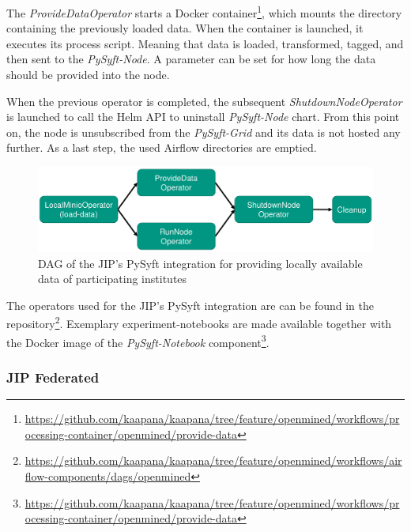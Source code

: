 The \textit{ProvideDataOperator} starts a Docker container\footnote{\url{https://github.com/kaapana/kaapana/tree/feature/openmined/workflows/processing-container/openmined/provide-data}}, which mounts the directory containing the previously loaded data. When the container is launched, it executes its process script. Meaning that data is loaded, transformed, tagged, and then sent to the \textit{PySyft-Node}. A parameter can be set for how long the data should be provided into the node.

When the previous operator is completed, the subsequent \textit{ShutdownNodeOperator} is launched to call the Helm API to uninstall \textit{PySyft-Node} chart.
From this point on, the node is unsubscribed from the \textit{PySyft-Grid} and its data is not hosted any further. As a last step, the used Airflow directories are emptied.

\begin{figure}[htbp!]
    \centerline{\includegraphics[width=1\textwidth]{1_Figures/DAG_PySyft.pdf}}
    \caption[DAG of the JIP's PySyft integration for providing locally available data of participating institutes]{DAG of the JIP's PySyft integration for providing locally available data of participating institutes}
\label{fig:DAG_PySyft}
\end{figure}

The operators used for the JIP's PySyft integration are can be found in the repository\footnote{\url{https://github.com/kaapana/kaapana/tree/feature/openmined/workflows/airflow-components/dags/openmined}}.
Exemplary experiment-notebooks are made available together with the Docker image of the \textit{PySyft-Notebook} component\footnote{\url{https://github.com/kaapana/kaapana/tree/feature/openmined/workflows/processing-container/openmined/provide-data}}.



\subsubsection{JIP Federated}

